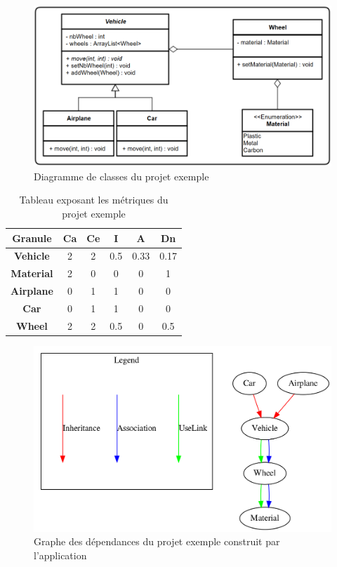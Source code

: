 \documentclass{scrartcl}
\begin{document}
\begin{appendices}
\begin{figure}[h!]
    \centering
    \includegraphics[scale=0.6]{img/example_uml.png}
    \caption{Diagramme de classes du projet exemple}
\end{figure}


\begin{table}[H]\caption{Tableau exposant les métriques du projet exemple}
    \centering
    \begin{tabular}{|c|c|c|c|c|c|}
        \hline
        \textbf{Granule} & \textbf{Ca} & \textbf{Ce} & \textbf{I} & \textbf{A} & \textbf{Dn} \\
        \hline
        \textbf{Vehicle} & 2 & 2 & 0.5 & 0.33 & 0.17 \\
        \hline
        \textbf{Material} & 2 & 0 & 0 & 0 & 1 \\
        \hline
        \textbf{Airplane} & 0 & 1 & 1 & 0 & 0  \\
        \hline
        \textbf{Car} & 0 & 1 & 1 & 0 & 0 \\
        \hline
        \textbf{Wheel} & 2 & 2 & 0.5 & 0 & 0.5 \\
        \hline
    \end{tabular}
\end{table}


\begin{figure}
    \centering
    \includegraphics[scale=0.6]{img/ExampleClassesGraph.png}
    \caption{Graphe des dépendances du projet exemple construit par l'application}
\end{figure}

\end{appendices}
\end{document}
